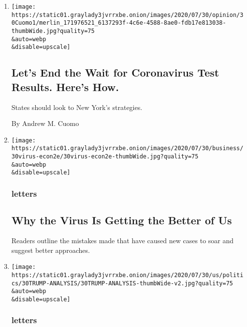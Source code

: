 \begin{enumerate}
\def\labelenumi{\arabic{enumi}.}
\item
  \href{/2020/07/31/opinion/coronavirus-testing-cuomo.html}{}

  \texttt{[image: https://static01.graylady3jvrrxbe.onion/images/2020/07/30/opinion/30Cuomo1/merlin\_171976521\_6137293f-4c6e-4588-8ae0-fdb17e813038-thumbWide.jpg?quality=75\\\&auto=webp\\\&disable=upscale]}

  \hypertarget{lets-end-the-wait-for-coronavirus-test-results-heres-how}{%
  \subsection{Let's End the Wait for Coronavirus Test Results. Here's
  How.}\label{lets-end-the-wait-for-coronavirus-test-results-heres-how}}

  States should look to New York's strategies.

  By Andrew M. Cuomo
\item
  \href{/2020/07/31/opinion/letters/coronavirus-economy.html}{}

  \texttt{[image: https://static01.graylady3jvrrxbe.onion/images/2020/07/30/business/30virus-econ2e/30virus-econ2e-thumbWide.jpg?quality=75\\\&auto=webp\\\&disable=upscale]}

  \hypertarget{letters}{%
  \subsubsection{letters}\label{letters}}

  \hypertarget{why-the-virus-is-getting-the-better-of-us}{%
  \subsection{Why the Virus Is Getting the Better of
  Us}\label{why-the-virus-is-getting-the-better-of-us}}

  Readers outline the mistakes made that have caused new cases to soar
  and suggest better approaches.
\item
  \href{/2020/07/31/opinion/letters/trump-election.html}{}

  \texttt{[image: https://static01.graylady3jvrrxbe.onion/images/2020/07/30/us/politics/30TRUMP-ANALYSIS/30TRUMP-ANALYSIS-thumbWide-v2.jpg?quality=75\\\&auto=webp\\\&disable=upscale]}

  \hypertarget{letters-1}{%
  \subsubsection{letters}\label{letters-1}}


\end{enumerate}
